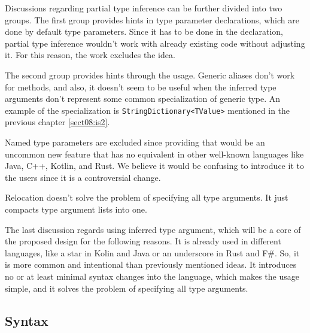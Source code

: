 Discussions regarding partial type inference can be further divided into two groups. 
The first group provides hints in type parameter declarations, which are done by default type parameters. 
Since it has to be done in the declaration, partial type inference wouldn’t work with already existing code without adjusting it.
For this reason, the work excludes the idea.
\par
The second group provides hints through the usage. 
Generic aliases don’t work for methods, and also, it doesn’t seem to be useful when the inferred type arguments don’t represent some common specialization of generic type.  
An example of the specialization is \texttt{StringDictionary<TValue>} mentioned in the previous chapter \ref{sect08:is2}.
\par
Named type parameters are excluded since providing that would be an uncommon new feature that has no equivalent in other well-known languages like Java, C++, Kotlin, and Rust. 
We believe it would be confusing to introduce it to the users since it is a controversial change.
\par
Relocation doesn’t solve the problem of specifying all type arguments. 
It just compacts type argument lists into one.
\par
The last discussion regards using inferred type argument, which will be a core of the proposed design for the following reasons. 
It is already used in different languages, like a star in Kolin and Java or an underscore in Rust and F\#. 
So, it is more common and intentional than previously mentioned ideas. 
It introduces no or at least minimal syntax changes into the language, which makes the usage simple, and it solves the problem of specifying all type arguments.

\subsection{Syntax}

